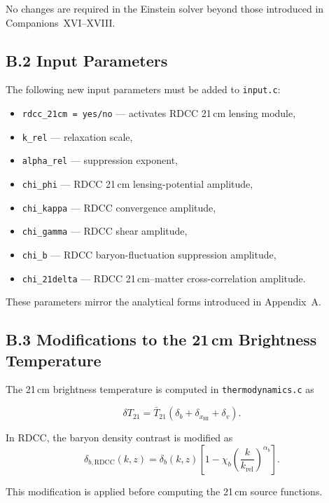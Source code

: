 \documentclass[11pt,a4paper]{article}
\begin{document}
No changes are required in the Einstein solver beyond those introduced in
Companions~XVI–XVIII.

\subsection*{B.2 Input Parameters}

The following new input parameters must be added to \texttt{input.c}:

\begin{itemize}
\item \texttt{rdcc\_21cm = yes/no} — activates RDCC 21\,cm lensing module,
\item \texttt{k\_rel} — relaxation scale,
\item \texttt{alpha\_rel} — suppression exponent,
\item \texttt{chi\_phi} — RDCC 21\,cm lensing-potential amplitude,
\item \texttt{chi\_kappa} — RDCC convergence amplitude,
\item \texttt{chi\_gamma} — RDCC shear amplitude,
\item \texttt{chi\_b} — RDCC baryon-fluctuation suppression amplitude,
\item \texttt{chi\_21delta} — RDCC 21\,cm–matter cross-correlation amplitude.
\end{itemize}

These parameters mirror the analytical forms introduced in Appendix~A.

\subsection*{B.3 Modifications to the 21\,cm Brightness Temperature}

The 21\,cm brightness temperature is computed in \texttt{thermodynamics.c} as


\[
\delta T_{21} = \bar{T}_{21}\left(\delta_{b} + \delta_{x_{\mathrm{HI}}} + \delta_{v}\right).
\]



In RDCC, the baryon density contrast is modified as
\begin{equation}
\delta_{b,\mathrm{RDCC}}(k,z)
=
\delta_{b}(k,z)
\left[
1
-
\chi_{b}
\left(
\frac{k}{k_{\mathrm{rel}}}
\right)^{\alpha_{b}}
\right].
\end{equation}

This modification is applied before computing the 21\,cm source functions.
\end{document}

